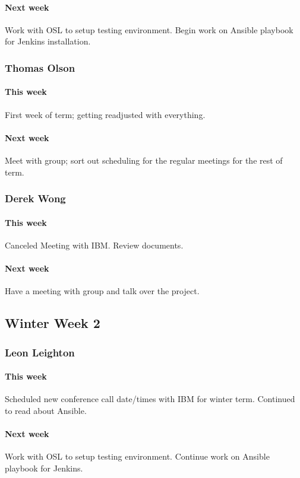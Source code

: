 \documentclass[10pt,letterpaper,onecolumn,draftclsnofoot]{IEEEtran}
\begin{document}
\paragraph{Next week}Work with OSL to setup testing environment.  
Begin work on Ansible playbook for Jenkins installation.


\subsubsection{Thomas Olson}
\paragraph{This week}First week of term; getting readjusted with everything.
\paragraph{Next week}Meet with group; sort out scheduling for the regular meetings for the rest of term.


\subsubsection{Derek Wong}
\paragraph{This week}Canceled Meeting with IBM\@. Review documents.
\paragraph{Next week}Have a meeting with group and talk over the project.


\subsection{Winter Week 2}
\subsubsection{Leon Leighton}
\paragraph{This week}Scheduled new conference call date/times with IBM for winter term.   
Continued to read about Ansible.
\paragraph{Next week}Work with OSL to setup testing environment.  
Continue work on Ansible playbook for Jenkins.
\end{document}
